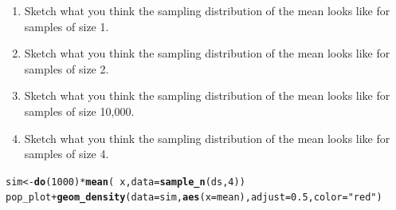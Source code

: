 \documentclass[10pt]{article}\usepackage[]{graphicx}\usepackage[]{color}
\makeatletter
\newcommand{\hlnum}[1]{\textcolor[rgb]{0.686,0.059,0.569}{#1}}%
\newcommand{\hlstr}[1]{\textcolor[rgb]{0.192,0.494,0.8}{#1}}%
\newcommand{\hlopt}[1]{\textcolor[rgb]{0,0,0}{#1}}%
\newcommand{\hlstd}[1]{\textcolor[rgb]{0.345,0.345,0.345}{#1}}%
\newcommand{\hlkwb}[1]{\textcolor[rgb]{0.69,0.353,0.396}{#1}}%
\newcommand{\hlkwc}[1]{\textcolor[rgb]{0.333,0.667,0.333}{#1}}%
\newcommand{\hlkwd}[1]{\textcolor[rgb]{0.737,0.353,0.396}{\textbf{#1}}}%
\newenvironment{kframe}{%
 \def\at@end@of@kframe{}%
 \ifinner\ifhmode%
  \def\at@end@of@kframe{\end{minipage}}%
  \begin{minipage}{\columnwidth}%
 \fi\fi%
 \def\FrameCommand##1{\hskip\@totalleftmargin \hskip-\fboxsep
 \colorbox{shadecolor}{##1}\hskip-\fboxsep
     \hskip-\linewidth \hskip-\@totalleftmargin \hskip\columnwidth}%
 \MakeFramed {\advance\hsize-\width
   \@totalleftmargin\z@ \linewidth\hsize
   \@setminipage}}%
 {\par\unskip\endMakeFramed%
 \at@end@of@kframe}
\newenvironment{knitrout}{}{} %
\makeatother
\begin{document}
\begin{enumerate}
  \itemsep1in
    \item Sketch what you think the sampling distribution of the mean looks like for samples of size 1.
    \item Sketch what you think the sampling distribution of the mean looks like for samples of size 2.
    \item Sketch what you think the sampling distribution of the mean looks like for samples of size 10,000.
    \item Sketch what you think the sampling distribution of the mean looks like for samples of size 4.
  \end{enumerate}
  \vspace{1in}

\begin{knitrout}\footnotesize
{}\color{fgcolor}\begin{kframe}
\begin{alltt}
\hlstd{sim} \hlkwb{<-} \hlkwd{do}\hlstd{(}\hlnum{1000}\hlstd{)} \hlopt{*} \hlkwd{mean}\hlstd{(}\hlopt{~}\hlstd{x,} \hlkwc{data} \hlstd{=} \hlkwd{sample_n}\hlstd{(ds,} \hlnum{4}\hlstd{))}
\hlstd{pop_plot} \hlopt{+} \hlkwd{geom_density}\hlstd{(}\hlkwc{data} \hlstd{= sim,} \hlkwd{aes}\hlstd{(}\hlkwc{x} \hlstd{= mean),} \hlkwc{adjust} \hlstd{=} \hlnum{0.5}\hlstd{,} \hlkwc{color} \hlstd{=} \hlstr{"red"}\hlstd{)}
\end{alltt}
\end{kframe}
\end{knitrout}
\end{document}
